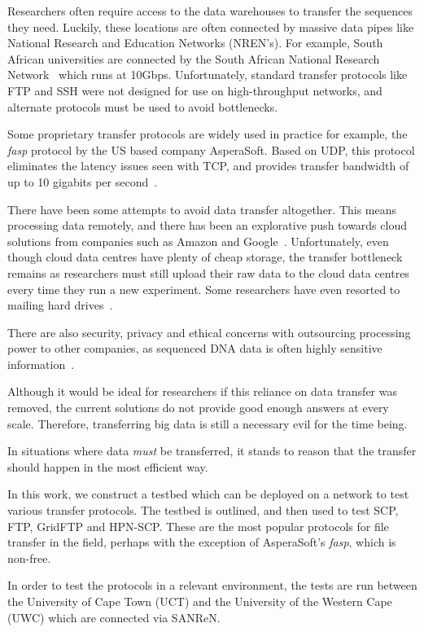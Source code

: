 \documentclass{sig-alternate-05-2015}
\begin{document}
Researchers often require access to the data warehouses to transfer the sequences they need. Luckily, these locations are often connected by massive data pipes like National Research and Education Networks (NREN's). For example, South African universities are connected by the South African National Research Network~\cite{sanren} which runs at 10Gbps. Unfortunately, standard transfer protocols like FTP and SSH were not designed for use on high-throughput networks, and alternate protocols must be used to avoid bottlenecks.

Some proprietary transfer protocols are widely used in practice \emdash for example, the \textit{fasp} protocol by the US based company AsperaSoft. Based on UDP, this protocol eliminates the latency issues seen with TCP, and provides transfer bandwidth of up to 10 gigabits per second~\cite{fan2010petabytes}.

There have been some attempts to avoid data transfer altogether. This means processing data remotely, and there has been an explorative push towards cloud solutions from companies such as Amazon and Google~\cite{baker2010next}. Unfortunately, even though cloud data centres have plenty of cheap storage, the transfer bottleneck remains as researchers must still upload their raw data to the cloud data centres every time they run a new experiment. Some researchers have even resorted to mailing hard drives~\cite{baker2010next}.

There are also security, privacy and ethical concerns with outsourcing processing power to other companies, as sequenced DNA data is often highly sensitive information~\cite{marx2013biology}.

Although it would be ideal for researchers if this reliance on data transfer was removed, the current solutions do not provide good enough answers at every scale. Therefore, transferring big data is still a necessary evil for the time being.

In situations where data \textit{must} be transferred, it stands to reason that the transfer should happen in the most efficient way.

In this work, we construct a testbed which can be deployed on a network to test various transfer protocols. The testbed is outlined, and then used to test SCP, FTP, GridFTP and HPN-SCP. These are the most popular protocols for file transfer in the field, perhaps with the exception of AsperaSoft's \textit{fasp}, which is non-free. 

In order to test the protocols in a relevant environment, the tests are run between the University of Cape Town (UCT) and the University of the Western Cape (UWC) which are connected via SANReN.
\end{document}
